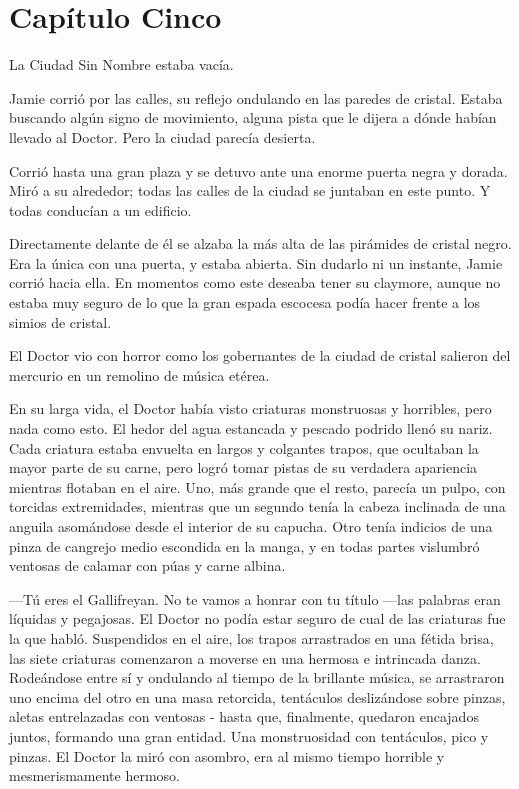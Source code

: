 \chapter*{Capítulo Cinco}

La Ciudad Sin Nombre estaba vacía.

Jamie corrió por las calles, su reflejo ondulando en las paredes de
cristal. Estaba buscando algún signo de movimiento, alguna pista que le
dijera a dónde habían llevado al Doctor. Pero la ciudad parecía
desierta.

Corrió hasta una gran plaza y se detuvo ante una enorme puerta negra y
dorada. Miró a su alrededor; todas las calles de la ciudad se juntaban
en este punto. Y todas conducían a un edificio.

Directamente delante de él se alzaba la más alta de las pirámides de
cristal negro. Era la única con una puerta, y estaba abierta. Sin
dudarlo ni un instante, Jamie corrió hacia ella. En momentos como este
 deseaba tener su claymore, aunque no estaba muy seguro de lo que la
gran espada escocesa podía hacer frente a los simios de cristal.

El Doctor vio con horror como los gobernantes de la ciudad de cristal
salieron del mercurio en un remolino de música etérea.

En su larga vida, el Doctor había visto criaturas monstruosas y
horribles, pero nada como esto. El hedor del agua estancada y pescado
podrido llenó su nariz. Cada criatura estaba envuelta en largos y
 colgantes trapos, que ocultaban la mayor parte de su carne, pero logró
tomar pistas de su verdadera apariencia mientras flotaban en el aire.
Uno, más grande que el resto, parecía un pulpo, con torcidas
extremidades, mientras que un segundo tenía la cabeza inclinada de una
anguila asomándose desde el interior de su capucha. Otro tenía indicios
de una pinza de cangrejo medio escondida en la manga, y en todas partes
vislumbró ventosas de calamar con púas y carne albina.

---Tú eres el Gallifreyan. No te vamos a honrar con tu título ---las
palabras eran líquidas y pegajosas. El Doctor no podía estar seguro de
cual de las criaturas fue la que habló. Suspendidos en el aire, los
trapos arrastrados en una fétida brisa, las siete criaturas comenzaron a
moverse en una hermosa e  intrincada danza. Rodeándose entre sí y
ondulando al tiempo de la brillante música, se arrastraron uno encima
del otro en una masa retorcida, tentáculos deslizándose sobre pinzas,
aletas entrelazadas con ventosas - hasta que, finalmente, quedaron
encajados juntos, formando una gran entidad. Una monstruosidad con
tentáculos, pico y pinzas. El Doctor la miró con asombro, era al mismo
tiempo horrible y mesmerismamente hermoso.

